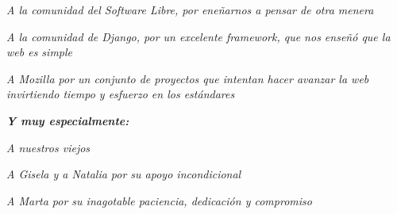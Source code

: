 \newpage
\thispagestyle{empty}
\begin{flushright}


{\it A la comunidad del Software Libre, por eneñarnos a pensar de otra
menera}\par

{\it A la comunidad de Django, por un excelente framework, que nos enseñó que 
la web es simple }\par
{\it A Mozilla por un conjunto de proyectos que intentan hacer avanzar la web
invirtiendo tiempo y esfuerzo en los estándares }\par
\par
\par
\vfill
{\it{\bf Y muy especialmente:}}\par
{\it A nuestros viejos}\par
{\it A Gisela y a Natalia por su apoyo incondicional}\par
{\it A Marta por su inagotable paciencia, dedicación y compromiso}\par


\end{flushright}
\newpage